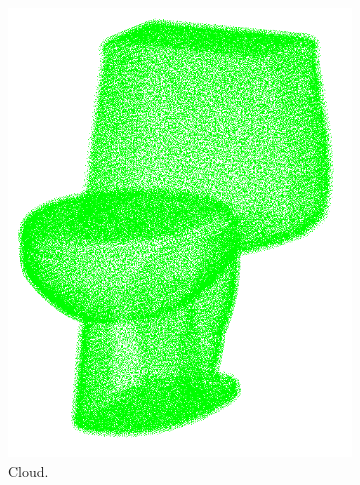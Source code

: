 \begin{figure}[!b]
\begin{subfigure}{0.32\linewidth}
    \includegraphics[width=\linewidth]{Figures/ObjRecog/toilet_cloud.png}
    \caption{Cloud.}
    \label{fig:objrecog:dataproc:cloud}
  \end{subfigure}
  \begin{subfigure}{0.32\linewidth}

\end{subfigure}
\end{figure}
